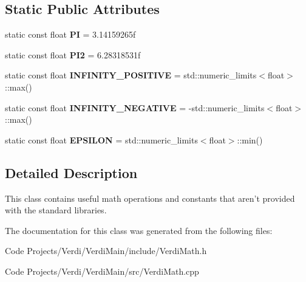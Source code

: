 \subsection*{\-Static \-Public \-Attributes}
\begin{DoxyCompactItemize}
\item 
\hypertarget{class_verdi_1_1_math_a34142ef2b6dfe71ea189b6a9a75c48d9}{static const float {\bfseries \-P\-I} = 3.\-14159265f}\label{class_verdi_1_1_math_a34142ef2b6dfe71ea189b6a9a75c48d9}

\item 
\hypertarget{class_verdi_1_1_math_ab1c94a0addbb0a703f3ed03b98b85829}{static const float {\bfseries \-P\-I2} = 6.\-28318531f}\label{class_verdi_1_1_math_ab1c94a0addbb0a703f3ed03b98b85829}

\item 
\hypertarget{class_verdi_1_1_math_a319f30ef67cfe6c509e15e71d2cd8f74}{static const float {\bfseries \-I\-N\-F\-I\-N\-I\-T\-Y\-\_\-\-P\-O\-S\-I\-T\-I\-V\-E} = std\-::numeric\-\_\-limits$<$float$>$\-::max()}\label{class_verdi_1_1_math_a319f30ef67cfe6c509e15e71d2cd8f74}

\item 
\hypertarget{class_verdi_1_1_math_a0efae61deba8df39da8168e53b53afb7}{static const float {\bfseries \-I\-N\-F\-I\-N\-I\-T\-Y\-\_\-\-N\-E\-G\-A\-T\-I\-V\-E} = -\/std\-::numeric\-\_\-limits$<$float$>$\-::max()}\label{class_verdi_1_1_math_a0efae61deba8df39da8168e53b53afb7}

\item 
\hypertarget{class_verdi_1_1_math_add629ae567dfabf4753c52792e73218c}{static const float {\bfseries \-E\-P\-S\-I\-L\-O\-N} = std\-::numeric\-\_\-limits$<$float$>$\-::min()}\label{class_verdi_1_1_math_add629ae567dfabf4753c52792e73218c}

\end{DoxyCompactItemize}


\subsection{\-Detailed \-Description}
\-This class contains useful math operations and constants that aren't provided with the standard libraries. 

\-The documentation for this class was generated from the following files\-:\begin{DoxyCompactItemize}
\item 
\-Code Projects/\-Verdi/\-Verdi\-Main/include/\-Verdi\-Math.\-h\item 
\-Code Projects/\-Verdi/\-Verdi\-Main/src/\-Verdi\-Math.\-cpp\end{DoxyCompactItemize}

